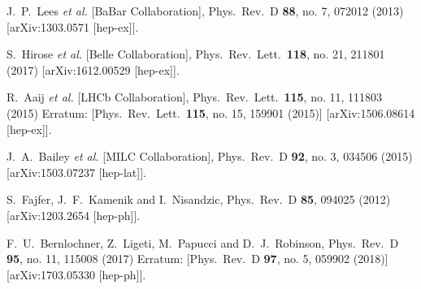 \documentclass[aps,prd,superscriptaddress,twocolumn,secnumarabic]{revtex4-1}
\begin{document}
\begin{thebibliography}{99}
  J.~P.~Lees {\it et al.} [BaBar Collaboration],
  Phys.\ Rev.\ D {\bf 88}, no. 7, 072012 (2013)
  [arXiv:1303.0571 [hep-ex]].


  S.~Hirose {\it et al.} [Belle Collaboration],
  Phys.\ Rev.\ Lett.\  {\bf 118}, no. 21, 211801 (2017)
  [arXiv:1612.00529 [hep-ex]].


  R.~Aaij {\it et al.} [LHCb Collaboration],
  Phys.\ Rev.\ Lett.\  {\bf 115}, no. 11, 111803 (2015)
  Erratum: [Phys.\ Rev.\ Lett.\  {\bf 115}, no. 15, 159901 (2015)]
  [arXiv:1506.08614 [hep-ex]].


  J.~A.~Bailey {\it et al.} [MILC Collaboration],
  Phys.\ Rev.\ D {\bf 92}, no. 3, 034506 (2015)
  [arXiv:1503.07237 [hep-lat]].


  S.~Fajfer, J.~F.~Kamenik and I.~Nisandzic,
  Phys.\ Rev.\ D {\bf 85}, 094025 (2012)
  [arXiv:1203.2654 [hep-ph]].


  F.~U.~Bernlochner, Z.~Ligeti, M.~Papucci and D.~J.~Robinson,
  Phys.\ Rev.\ D {\bf 95}, no. 11, 115008 (2017)
  Erratum: [Phys.\ Rev.\ D {\bf 97}, no. 5, 059902 (2018)]
  [arXiv:1703.05330 [hep-ph]].



\end{thebibliography}
\end{document}

